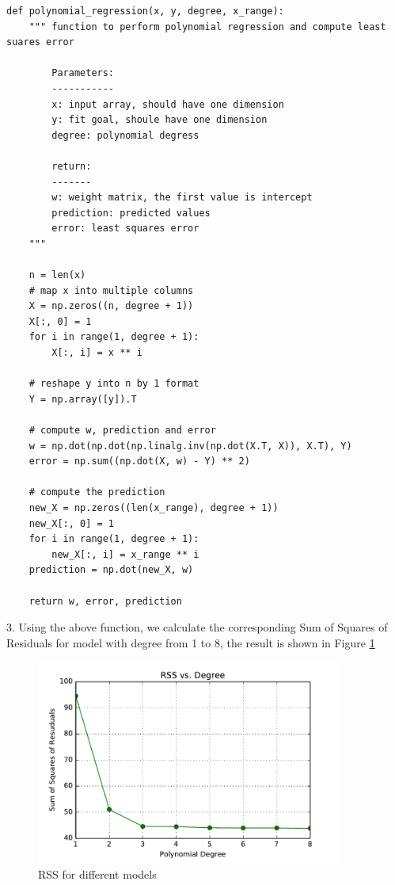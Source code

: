 \begin{description}
\begin{lstlisting}
def polynomial_regression(x, y, degree, x_range):
    """ function to perform polynomial regression and compute least suares error
        
        Parameters:
        -----------
        x: input array, should have one dimension 
        y: fit goal, shoule have one dimension
        degree: polynomial degress
        
        return:
        -------
        w: weight matrix, the first value is intercept
        prediction: predicted values
        error: least squares error
    """
    
    n = len(x)
    # map x into multiple columns
    X = np.zeros((n, degree + 1))
    X[:, 0] = 1
    for i in range(1, degree + 1):
        X[:, i] = x ** i
    
    # reshape y into n by 1 format
    Y = np.array([y]).T
    
    # compute w, prediction and error
    w = np.dot(np.dot(np.linalg.inv(np.dot(X.T, X)), X.T), Y)
    error = np.sum((np.dot(X, w) - Y) ** 2)
    
    # compute the prediction
    new_X = np.zeros((len(x_range), degree + 1))
    new_X[:, 0] = 1
    for i in range(1, degree + 1):
        new_X[:, i] = x_range ** i
    prediction = np.dot(new_X, w)
    
    return w, error, prediction
\end{lstlisting}


\item{3. }
Using the above function, we calculate the corresponding Sum of Squares of Residuals for model with degree from 1 to 8, the result is shown in Figure \ref{fig:RSS}
\begin{figure}[H]
\centering
\includegraphics[width=0.9\textwidth]{./figures/rss.pdf}
\caption{\label{fig:RSS} RSS for different models}
\end{figure}
 

\end{description}
